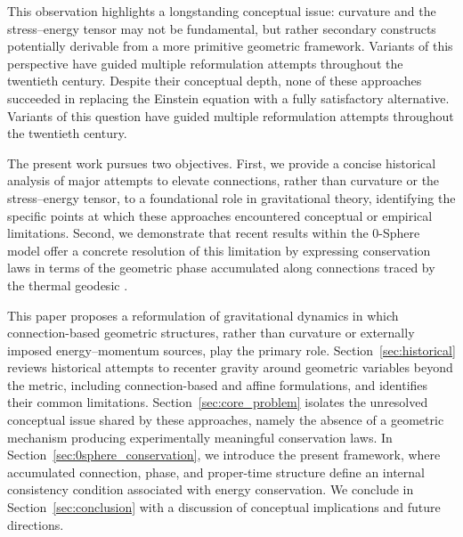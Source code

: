 \documentclass[%
 reprint,
 amsmath,amssymb,
 aps,
 prb,
]{revtex4-2}
\numberwithin{equation}{section}
\begin{document}
This observation highlights a longstanding conceptual issue: curvature and the stress--energy tensor may not be fundamental, but rather secondary constructs potentially derivable from a more primitive geometric framework. Variants of this perspective have guided multiple reformulation attempts throughout the twentieth century. Despite their conceptual depth, none of these approaches succeeded in replacing the Einstein equation with a fully satisfactory alternative. Variants of this question have guided multiple reformulation attempts throughout the twentieth century.

The present work pursues two objectives. First, we provide a concise historical analysis of major attempts to elevate connections, rather than curvature or the stress--energy tensor, to a foundational role in gravitational theory, identifying the specific points at which these approaches encountered conceptual or empirical limitations. Second, we demonstrate that recent results within the 0-Sphere model offer a concrete resolution of this limitation by expressing conservation laws in terms of the geometric phase accumulated along connections traced by the thermal geodesic \cite{hanamura17765017}.

This paper proposes a reformulation of gravitational dynamics in which connection-based geometric structures, rather than curvature or externally imposed energy--momentum sources, play the primary role. 
Section~\ref{sec:historical} reviews historical attempts to recenter gravity around geometric variables beyond the metric, including connection-based and affine formulations, and identifies their common limitations. 
Section~\ref{sec:core_problem} isolates the unresolved conceptual issue shared by these approaches, namely the absence of a geometric mechanism producing experimentally meaningful conservation laws. 
In Section~\ref{sec:0sphere_conservation}, we introduce the present framework, where accumulated connection, phase, and proper-time structure define an internal consistency condition associated with energy conservation.  
We conclude in Section~\ref{sec:conclusion} with a discussion of conceptual implications and future directions.


\clearpage
\end{document}
